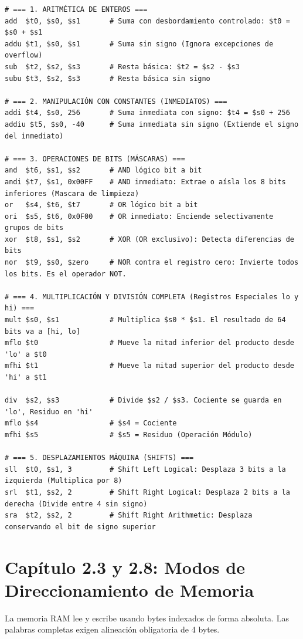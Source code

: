 \documentclass[11pt,letterpaper]{article}
\begin{document}
\begin{lstlisting}[caption={Demostración total de operaciones de tipo aritmético-lógico.}]
# === 1. ARITMÉTICA DE ENTEROS ===
add  $t0, $s0, $s1       # Suma con desbordamiento controlado: $t0 = $s0 + $s1
addu $t1, $s0, $s1       # Suma sin signo (Ignora excepciones de overflow)
sub  $t2, $s2, $s3       # Resta básica: $t2 = $s2 - $s3
subu $t3, $s2, $s3       # Resta básica sin signo

# === 2. MANIPULACIÓN CON CONSTANTES (INMEDIATOS) ===
addi $t4, $s0, 256       # Suma inmediata con signo: $t4 = $s0 + 256
addiu $t5, $s0, -40      # Suma inmediata sin signo (Extiende el signo del inmediato)

# === 3. OPERACIONES DE BITS (MÁSCARAS) ===
and  $t6, $s1, $s2       # AND lógico bit a bit
andi $t7, $s1, 0x00FF    # AND inmediato: Extrae o aísla los 8 bits inferiores (Mascara de limpieza)
or   $s4, $t6, $t7       # OR lógico bit a bit
ori  $s5, $t6, 0x0F00    # OR inmediato: Enciende selectivamente grupos de bits
xor  $t8, $s1, $s2       # XOR (OR exclusivo): Detecta diferencias de bits
nor  $t9, $s0, $zero     # NOR contra el registro cero: Invierte todos los bits. Es el operador NOT.

# === 4. MULTIPLICACIÓN Y DIVISIÓN COMPLETA (Registros Especiales lo y hi) ===
mult $s0, $s1            # Multiplica $s0 * $s1. El resultado de 64 bits va a [hi, lo]
mflo $t0                 # Mueve la mitad inferior del producto desde 'lo' a $t0
mfhi $t1                 # Mueve la mitad superior del producto desde 'hi' a $t1

div  $s2, $s3            # Divide $s2 / $s3. Cociente se guarda en 'lo', Residuo en 'hi'
mflo $s4                 # $s4 = Cociente
mfhi $s5                 # $s5 = Residuo (Operación Módulo)

# === 5. DESPLAZAMIENTOS MÁQUINA (SHIFTS) ===
sll  $t0, $s1, 3         # Shift Left Logical: Desplaza 3 bits a la izquierda (Multiplica por 8)
srl  $t1, $s2, 2         # Shift Right Logical: Desplaza 2 bits a la derecha (Divide entre 4 sin signo)
sra  $t2, $s2, 2         # Shift Right Arithmetic: Desplaza conservando el bit de signo superior
\end{lstlisting}

\section{Capítulo 2.3 y 2.8: Modos de Direccionamiento de Memoria}
La memoria RAM lee y escribe usando bytes indexados de forma absoluta. Las palabras completas exigen alineación obligatoria de 4 bytes.
\end{document}

